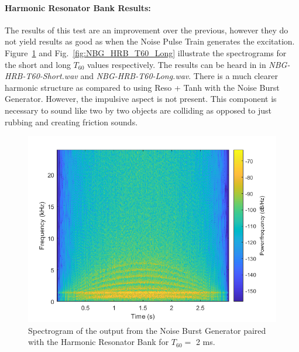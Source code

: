 \documentclass[../main.tex]{subfiles}
\begin{document}
\clearpage

\paragraph{Harmonic Resonator Bank Results:}
The results of this test are an improvement over the previous, however they do not yield results as good as when the Noise Pulse Train generates the excitation. Figure~\ref{fig:NBG_HRB_T60_Short} and Fig.~\ref{fig:NBG_HRB_T60_Long} illustrate the spectrograms for the short and long $T_{60}$ values respectively. The results can be heard in in \emph{NBG-HRB-T60-Short.wav} and \emph{NBG-HRB-T60-Long.wav}. There is a much clearer harmonic structure as compared to using Reso + Tanh with the Noise Burst Generator. However, the impulsive aspect is not present. This component is necessary to sound like two by two objects are colliding as opposed to just rubbing and creating friction sounds.

\begin{figure}[h!]
    \centering
    \includegraphics[scale=.65]{./images/plots/NBG-HRB-T60-Short.png}
    \caption{Spectrogram of the output from the Noise Burst Generator paired with the Harmonic Resonator Bank for $T_{60} = $ 2 ms.}
    \label{fig:NBG_HRB_T60_Short}
\end{figure}
\end{document}
